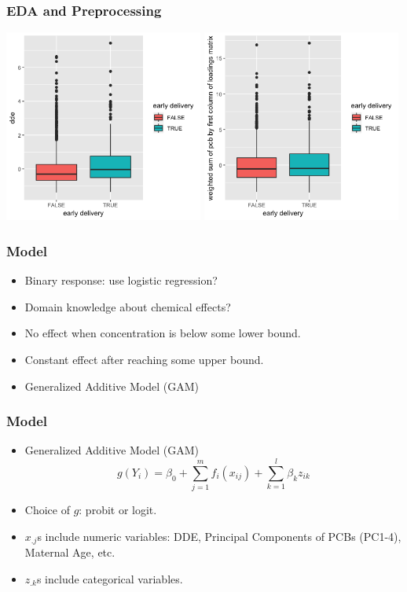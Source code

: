 \documentclass{beamer}
\begin{document}
\begin{frame}
    \frametitle{EDA and Preprocessing}

    
    \includegraphics[width=0.49\textwidth]{ddeVSearly.png}
    \includegraphics[width=0.49\textwidth]{pcbVSearly.png}
    
        
\end{frame}




\begin{frame}
\frametitle{Model}


\begin{itemize}
\item Binary response: use logistic regression?
\pause
\item Domain knowledge about chemical effects?
\pause
\item No effect when concentration is below some lower bound.
\pause
\item Constant effect after reaching some upper bound.
\pause
\item Generalized Additive Model (GAM)
\end{itemize}
\end{frame}


\begin{frame}
\frametitle{Model}

\begin{itemize}
\item Generalized Additive Model (GAM)
$$g(Y_i) = \beta_0 + \sum_{j=1}^m f_i(x_{ij}) + \sum_{k=1}^l \beta_{k}z_{ik}$$

\item Choice of $g$: probit or logit.
\item $x_{.j}$s include numeric variables: DDE, Principal Components of PCBs (PC1-4), Maternal Age, etc.
\item $z_{.k}$s include categorical variables.

\end{itemize}
\end{frame}
\end{document}
